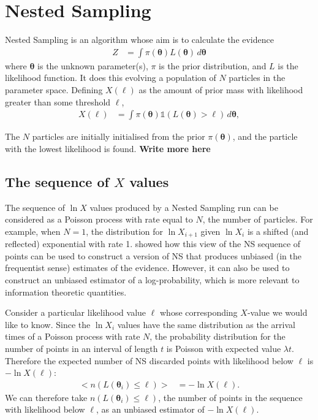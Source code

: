 \documentclass[entropy,article,accept,oneauthor,pdftex,10pt,a4paper]{mdpi}
\newcommand{\todo}{\color{orange} \bf}
\newcommand{\x}{\boldsymbol{\theta}}
\begin{document}
\section{Nested Sampling}

Nested Sampling \citep[NS][]{skilling2006nested} is an algorithm whose aim is
to calculate the evidence
\begin{align}
Z &= \int \pi(\x) L(\x) \, d\x
\end{align}
where $\x$ is the unknown parameter(s), $\pi$ is the prior distribution,
and $L$ is the likelihood function. It does this evolving a population of
$N$ particles in the parameter space.
Defining $X(\ell)$ as the amount of prior mass with likelihood greater than
some threshold $\ell$,
\begin{align}
X(\ell) &= \int \pi(\x) \mathds{1}\left(L(\x) > \ell\right) \, d\x,
\end{align} 

The $N$ particles are initially initialised from the prior $\pi(\x)$, and the particle with the lowest likelihood is found.
{\todo Write more here}

\subsection{The sequence of $X$ values}

The sequence of $\ln X$ values produced by a Nested Sampling run can be
considered as a Poisson process with rate equal to $N$, the number of
particles. For example, when $N=1$, the distribution for $\ln X_{i+1}$
given $\ln X_i$ is a shifted (and reflected) exponential with rate 1.
\citet{Walter2015} showed how this view of the NS sequence of points
can be used to construct a
version of NS that produces unbiased (in the frequentist sense)
estimates of the evidence.
However, it can also be used to construct an unbiased estimator of
a log-probability, which is more relevant to information theoretic
quantities.

Consider a particular likelihood value $\ell$ whose corresponding $X$-value
we would like to know. Since the $\ln X_i$ values have the same distribution
as the arrival times of a Poisson process with rate $N$, the probability
distribution for the number of points in an interval of length $t$ is
Poisson with expected value $\lambda t$. Therefore the expected number of
NS discarded points with likelihood below $\ell$ is $-\ln X(\ell)$:
\begin{align}
\big< n(L(\x_i) \leq \ell) \big> &= -\ln X(\ell).
\end{align}
We can therefore take $n(L(\x_i) \leq \ell)$, the number of points in the
sequence with likelihood below $\ell$, as an unbiased estimator of
$-\ln X(\ell)$.
\end{document}
